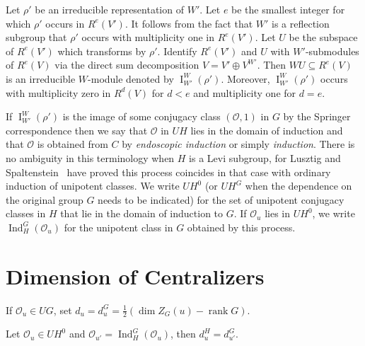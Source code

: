 \documentclass{amsart}
\newenvironment{cthm}[1]
  {\renewcommand\thethm{\sc #1}\thm}
  {\endthm}
\newcommand\I		{\operatorname{I}}
\newcommand\Ind	{\operatorname{Ind}}
\newcommand\IndHG	{\Ind_H^G(\cO_u)}
\newcommand\cO		{{\mathcal O}}
\newcommand\rank	{\operatorname{rank}}
\newcommand\UHo	{UH^0}
\begin{document}
Let $\rho'$ be an irreducible representation of $W'$.  Let $e$ be
the smallest 
integer
for which $\rho'$ occurs in $R^e(V')$.  It follows from the fact
that $W'$ is
a reflection subgroup that $\rho'$ occurs with multiplicity one
in $R^e(V')$.
Let $U$ be the subspace of $R^e(V')$
which transforms by $\rho'$.  Identify $R^e(V')$  and $U$ with
$W'$-submodules of $R^e(V)$ via the direct sum decomposition 
$V = V' \oplus V^{W'}$.  Then $WU \subseteq R^e(V)$ is an
irreducible
$W$-module denoted by $\I_{W'}^W (\rho')$.  Moreover, $\I_{W'}^W
(\rho')$
occurs with multiplicity zero in $R^d(V)$ for $d<e$ and
multiplicity one
for $d=e$.

If $\I_{W'}^W (\rho')$ is the image of some conjugacy class
$(\cO,1)$ in $G$
by the Springer correspondence then we say that $\cO$ in $UH$ lies
in the 
domain of induction and that $\cO$ is obtained from $C$ by 
{\it endoscopic induction\/} or simply {\it induction}.  There is
no
ambiguity in this terminology when $H$ is a Levi subgroup, for
Lusztig
and Spaltenstein~\cite{LS} have proved this process coincides in
that case
with ordinary induction of unipotent classes.  We write $\UHo$
(or $UH^G$
when the dependence on the original group $G$ needs to be
indicated) for the
set of unipotent conjugacy classes in $H$ that lie in the domain
of induction
to $G$.  If $\cO_u$ lies in $\UHo$, we write $\IndHG$ for the
unipotent class
in $G$ obtained by this process.


\section{Dimension of Centralizers} %

\bigskip

If $\cO_u \in UG$, set $d_u = d_u^G = \frac 12(\dim Z_G(u) - \rank
G)$.

\begin{cthm}{Proposition} Let $\cO_u \in \UHo$ and $\cO_{u'} =
\IndHG$, then
     $d_u^H = d_{u'}^G$.
     \end{cthm}
\end{document}
